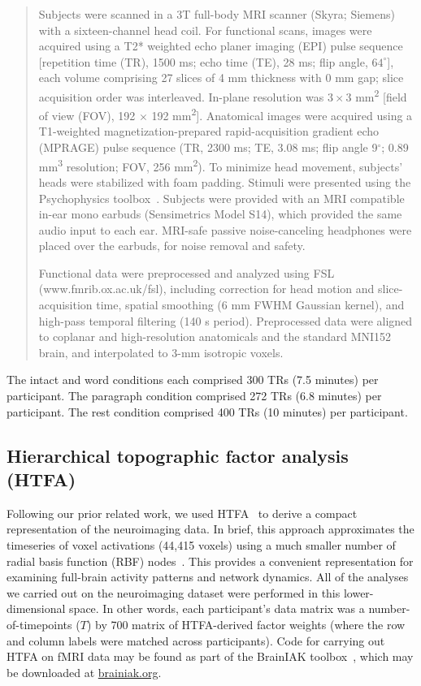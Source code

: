 \documentclass[english, 11pt]{article}
\begin{document}
\begin{quote}
Subjects were scanned in a 3T full-body MRI scanner (Skyra; Siemens) with a
sixteen-channel head coil. For functional scans, images were acquired using a
T2* weighted echo planer imaging (EPI) pulse sequence [repetition time (TR),
1500 ms; echo time (TE), 28 ms; flip angle, $64^\circ$], each volume comprising
27 slices of 4 mm thickness with 0 mm gap; slice acquisition order was
interleaved. In-plane resolution was $3 \times 3$ mm\textsuperscript{2} [field
of view (FOV), 192 $\times$ 192 mm\textsuperscript{2}]. Anatomical images were
acquired using a T1-weighted magnetization-prepared rapid-acquisition gradient
echo (MPRAGE) pulse sequence (TR, 2300 ms; TE, 3.08 ms; flip angle 9$^\circ$;
0.89 mm\textsuperscript{3} resolution; FOV, 256 mm\textsuperscript{2}). To
minimize head movement, subjects' heads were stabilized with foam padding.
Stimuli were presented using the Psychophysics toolbox~\citep{Brai97,Pell97}.
Subjects were provided with an MRI compatible in-ear mono earbuds (Sensimetrics
Model S14), which provided the same audio input to each ear. MRI-safe passive
noise-canceling headphones were placed over the earbuds, for noise removal and
safety. 

Functional data were preprocessed and analyzed using FSL
(www.fmrib.ox.ac.uk/fsl), including correction for head motion and
slice-acquisition time, spatial smoothing (6 mm FWHM Gaussian kernel), and
high-pass temporal filtering (140 s period). Preprocessed data were aligned to
coplanar and high-resolution anatomicals and the standard MNI152 brain, and
interpolated to 3-mm isotropic voxels.
\end{quote}

The intact and word conditions each comprised 300 TRs (7.5 minutes) per participant.
The paragraph condition comprised 272 TRs (6.8 minutes) per participant. The rest
condition comprised 400 TRs (10 minutes) per participant.

\subsection*{Hierarchical topographic factor analysis (HTFA)}

Following our prior related work, we used HTFA~\citep{MannEtal18} to derive a
compact representation of the neuroimaging data. In brief, this approach
approximates the timeseries of voxel activations (44,415 voxels) using a much
smaller number of radial basis function (RBF) nodes~\citep[in this case, 700
nodes, as determined by an optimization procedure;][]{MannEtal18}.  This
provides a convenient representation for examining full-brain activity patterns
and network dynamics. All of the analyses we carried out on the neuroimaging
dataset were performed in this lower-dimensional space. In other words, each
participant's data matrix was a number-of-timepoints ($T$) by 700 matrix of
HTFA-derived factor weights (where the row and column labels were matched
across participants). Code for carrying out HTFA on fMRI data may be found as
part of the BrainIAK toolbox~\citep{CapoEtal17, KumaEtal21}, which may be
downloaded at \href{https://brainiak.org/}{brainiak.org}.
\end{document}
